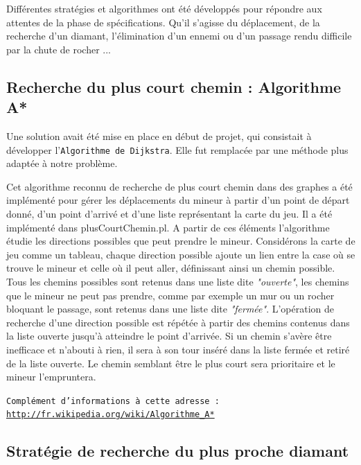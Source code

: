 \documentclass[a4paper,11pt]{article}
\begin{document}
Diff\'erentes strat\'egies et algorithmes ont \'et\'e d\'evelopp\'es pour r\'epondre aux attentes de la phase de sp\'ecifications.  Qu'il s'agisse du d\'eplacement, de la recherche d'un diamant, l'\'elimination d'un ennemi ou d'un passage rendu difficile par la chute de rocher ...\\

	\subsection{Recherche du plus court chemin : Algorithme A*}
	
Une solution avait \'et\'e mise en place en d\'ebut de projet, qui consistait \`a d\'evelopper l'\texttt{Algorithme de Dijkstra}. Elle fut remplac\'ee par une m\'ethode plus adapt\'ee \`a notre probl\`eme.
		
Cet algorithme reconnu de recherche de plus court chemin dans des graphes a \'et\'e impl\'ement\'e pour g\'erer les d\'eplacements du mineur \`a partir d'un point de d\'epart donn\'e, d'un point d'arriv\'e et d'une liste repr\'esentant la carte du jeu. Il a \'et\'e impl\'ement\'e dans plusCourtChemin.pl. A partir de ces \'el\'ements l'algorithme \'etudie les directions possibles que peut prendre le mineur. Consid\'erons la carte de jeu comme un tableau, chaque direction possible ajoute un lien entre la case o\`u se trouve le mineur et celle o\`u il peut aller, d\'efinissant ainsi un chemin possible. Tous les chemins possibles sont retenus dans une liste dite \textit{"ouverte"}, les chemins que le mineur ne peut pas prendre, comme par exemple un mur ou un rocher bloquant le passage, sont retenus dans une liste dite \textit{"ferm\'ee"}.  L'op\'eration de recherche d'une direction possible est r\'ep\'et\'ee \`a partir des chemins contenus dans la liste ouverte jusqu'\`a atteindre le point d'arriv\'ee. Si un chemin s'av\`ere \^etre inefficace et n'abouti \`a rien, il sera \`a son tour ins\'er\'e dans la liste ferm\'ee et retir\'e de la liste ouverte. Le chemin semblant \^etre le plus court sera prioritaire et le mineur l'empruntera.

\begin{center}
\texttt{Compl\'ement d'informations \`a cette adresse : \url{http://fr.wikipedia.org/wiki/Algorithme_A*}}
\end{center}

	\subsection{Strat\'egie de recherche du plus proche diamant}
	
\end{document}
